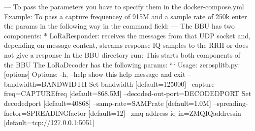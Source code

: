{}--- To pass the parameters you have to specify them in the docker-compose.yml\markdownRendererInterblockSeparator
{}Example: \markdownRendererInterblockSeparator
{}To pass a capture frequencey of 915M and a sample rate of 250k enter the params in the following way in the command field:\markdownRendererInterblockSeparator
{} \markdownRendererInterblockSeparator
{}---\markdownRendererInterblockSeparator
{}\markdownRendererInterblockSeparator
{}The BBU has two components: * LoRaResponder: receives the messages from that UDP socket and, depending on message content, streams response IQ samples to the RRH or does not give a response\markdownRendererInterblockSeparator
{}In the BBU directory run:\markdownRendererInterblockSeparator
{}\markdownRendererInterblockSeparator
{}This starts both components of the BBU\markdownRendererInterblockSeparator
{}\markdownRendererInterblockSeparator
{}The LoRa\markdownRendererUnderscore{}Decoder has the following params:\markdownRendererInterblockSeparator
{}``` Usage: zerosplit\markdownRendererUnderscore{}b.py: [options]\markdownRendererInterblockSeparator
{}Options: -h, --help show this help message and exit --bandwidth=BANDWIDTH Set bandwidth [default=125000] --capture-freq=CAPTUREfreq [default=868.5M] --decoded-out-port=DECODEDPORT Set decodedport [default=40868] --samp-rate=SAMPrate [default=1.0M] --spreading-factor=SPREADINGfactor [default=12] --zmq-address-iq-in=ZMQIQaddressin [default=tcp://127.0.0.1:5051]\markdownRendererInterblockSeparator
